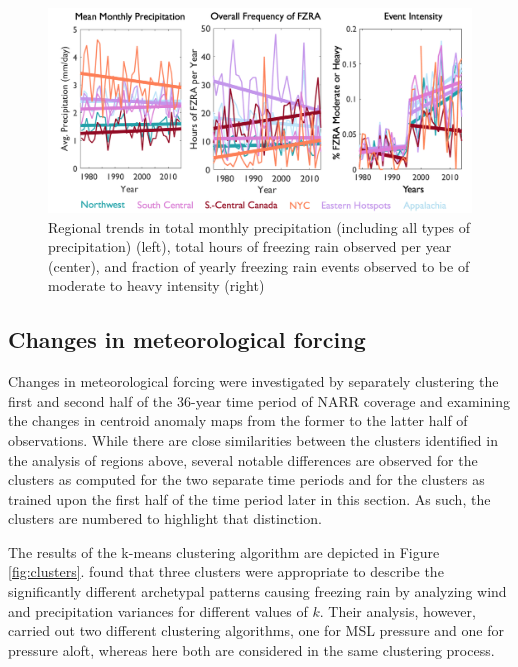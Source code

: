 \documentclass[twocol]{ametsoc}
\begin{document}
\begin{figure}
\centering
\includegraphics[width=1\textwidth]{regional_Trends.png}
\caption{\label{fig:regional_trends} Regional trends in total monthly precipitation (including all types of precipitation) (left), total hours of freezing rain observed per year (center), and fraction of yearly freezing rain events observed to be of moderate to heavy intensity (right)}
\end{figure}

\subsection{Changes in meteorological forcing}
Changes in meteorological forcing were investigated by separately clustering the first and second half of the 36-year time period of NARR coverage and examining the changes in centroid anomaly maps from the former to the  latter half of observations. While there are close similarities between the clusters identified in the analysis of regions above, several notable differences are observed for the clusters as computed for the two separate time periods and for the clusters as trained upon the first half of the time period later in this section. As such, the clusters are numbered to highlight that distinction.

The results of the k-means clustering algorithm are depicted in Figure \ref{fig:clusters}. \citet{erfani2012automated} found that three clusters were appropriate to describe the significantly different archetypal patterns causing freezing rain by analyzing wind and precipitation variances for different values of $k$. Their analysis, however, carried out two different clustering algorithms, one for MSL pressure and one for pressure aloft, whereas here both are considered in the same clustering process. 
\end{document}
